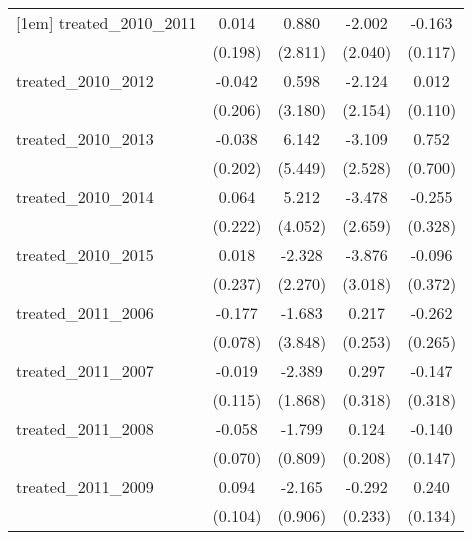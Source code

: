 {\begin{tabular}{l*{4}{c}}
[1em]
treated\_2010\_2011&       0.014         &       0.880         &      -2.002         &      -0.163         \\
            &     (0.198)         &     (2.811)         &     (2.040)         &     (0.117)         \\
[1em]
treated\_2010\_2012&      -0.042         &       0.598         &      -2.124         &       0.012         \\
            &     (0.206)         &     (3.180)         &     (2.154)         &     (0.110)         \\
[1em]
treated\_2010\_2013&      -0.038         &       6.142         &      -3.109         &       0.752         \\
            &     (0.202)         &     (5.449)         &     (2.528)         &     (0.700)         \\
[1em]
treated\_2010\_2014&       0.064         &       5.212         &      -3.478         &      -0.255         \\
            &     (0.222)         &     (4.052)         &     (2.659)         &     (0.328)         \\
[1em]
treated\_2010\_2015&       0.018         &      -2.328         &      -3.876         &      -0.096         \\
            &     (0.237)         &     (2.270)         &     (3.018)         &     (0.372)         \\
[1em]
treated\_2011\_2006&      -0.177\sym{*}  &      -1.683         &       0.217         &      -0.262         \\
            &     (0.078)         &     (3.848)         &     (0.253)         &     (0.265)         \\
[1em]
treated\_2011\_2007&      -0.019         &      -2.389         &       0.297         &      -0.147         \\
            &     (0.115)         &     (1.868)         &     (0.318)         &     (0.318)         \\
[1em]
treated\_2011\_2008&      -0.058         &      -1.799\sym{*}  &       0.124         &      -0.140         \\
            &     (0.070)         &     (0.809)         &     (0.208)         &     (0.147)         \\
[1em]
treated\_2011\_2009&       0.094         &      -2.165\sym{*}  &      -0.292         &       0.240         \\
            &     (0.104)         &     (0.906)         &     (0.233)         &     (0.134)         \\

\end{tabular}}
